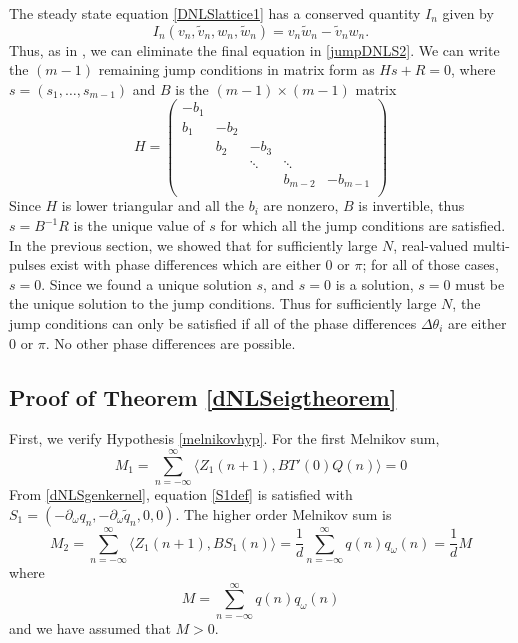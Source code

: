 \documentclass[12pt]{article}
\begin{document}
The steady state equation \eqref{DNLSlattice1} has a conserved quantity $I_n$ given by
\begin{equation}
I_n(v_n, \tilde{v}_n, w_n, \tilde{w}_n) = 
v_n \tilde{w}_n - \tilde{v}_n w_n.
\end{equation}
Thus, as in \cite{SandstedeStrut}, we can eliminate the final equation in \eqref{jumpDNLS2}. We can write the $(m-1)$ remaining jump conditions in matrix form as $H s + R = 0$, where $s = (s_1, \dots, s_{m-1})$ and $B$ is the $(m-1)\times(m-1)$ matrix
\[
H = \begin{pmatrix}
-b_1 \\
b_1 & -b_2 \\
& b_2 & -b_3 \\
&& \ddots & \ddots \\
&&& b_{m-2} & -b_{m-1} \\
\end{pmatrix}
\]
Since $H$ is lower triangular and all the $b_i$ are nonzero, $B$ is invertible, thus $s = B^{-1}R$ is the unique value of $s$ for which all the jump conditions are satisfied. In the previous section, we showed that for sufficiently large $N$, real-valued multi-pulses exist with phase differences which are either 0 or $\pi$; for all of those cases, $s = 0$. Since we found a unique solution $s$, and $s = 0$ is a solution, $s = 0$ must be the unique solution to the jump conditions. Thus for sufficiently large $N$, the jump conditions can only be satisfied if all of the phase differences $\Delta \theta_i$ are either 0 or $\pi$. No other phase differences are possible.

\subsection{Proof of Theorem \ref{dNLSeigtheorem}}

First, we verify Hypothesis \eqref{melnikovhyp}. For the first Melnikov sum,
\[
M_1 = \sum_{n=-\infty}^\infty \langle Z_1(n+1), B T'(0)Q(n) \rangle = 0
\]
From \eqref{dNLSgenkernel}, equation \eqref{S1def} is satisfied with $S_1 = (-\partial_\omega q_n, -\partial_\omega \tilde{q}_n, 0, 0)$. The higher order Melnikov sum is
\[
M_2 = \sum_{n=-\infty}^\infty \langle Z_1(n+1), B S_1(n) \rangle =
\frac{1}{d} \sum_{n=-\infty}^\infty q(n) q_\omega(n) = \frac{1}{d}M
\]
where
\[
M = \sum_{n=-\infty}^\infty q(n) q_\omega(n)
\]
and we have assumed that $M > 0$. 
\end{document}
